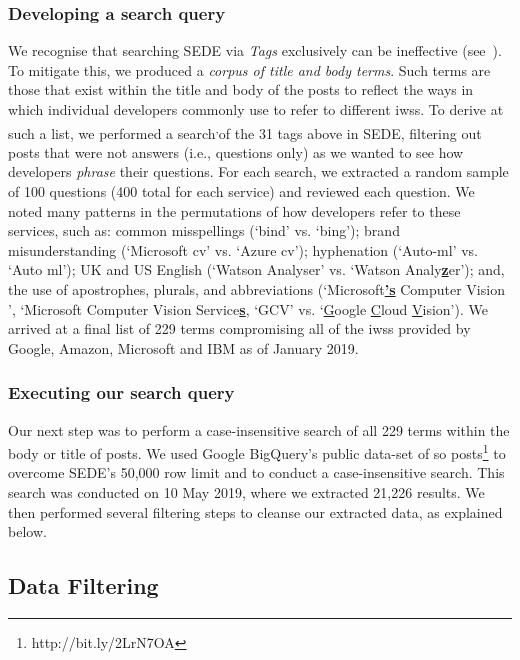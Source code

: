 \subsubsection{Developing a search query}
We recognise that searching SEDE via \textit{Tags} exclusively can be ineffective (see~\citep{Tahir:2018ks,Barua:2012gz}). To mitigate this, we produced a \textit{corpus of title and body terms}. Such terms are those that exist within the title and body of the posts to reflect the ways in which individual developers commonly use to refer to different \glspl{iws}. To derive at such a list, we performed a search\footnotemark[\footnotesearchdate{}]\textsuperscript{,}\footnotemark[\footnotereproducability{}] of the 31 tags above in SEDE, filtering out posts that were not answers (i.e., questions only) as we wanted to see how developers \textit{phrase} their questions. For each search, we extracted a random sample of 100 questions (400 total for each service) and reviewed each question. We noted many patterns in the permutations of how developers refer to these services, such as: common misspellings (`bind' vs. `bing'); brand misunderstanding (`Microsoft \gls{cv}' vs. `Azure \gls{cv}'); hyphenation (`Auto-\gls{ml}' vs. `Auto \gls{ml}'); UK and US English (`Watson Analyser' vs. `Watson Analy\uline{\textbf{z}}er'); and, the use of apostrophes, plurals, and abbreviations (`Microsoft\uline{\textbf{'s}} Computer Vision ', `Microsoft Computer Vision Service\uline{\textbf{s}}, `GCV' vs. `\uline{G}oogle \uline{C}loud \uline{V}ision'). We arrived at a final list of 229 terms compromising all of the \glspl{iws} provided by Google, Amazon, Microsoft and IBM as of January 2019\footnotemark[3].

\subsubsection{Executing our search query}

Our next step was to perform a case-insensitive search of all 229 terms within the body or title of posts. We used Google BigQuery's public data-set of \gls{so} posts\footnote{http://bit.ly/2LrN7OA} to overcome SEDE's 50,000 row limit and to conduct a case-insensitive search. This search was conducted on 10 May 2019, where we extracted 21,226 results. We then performed several filtering steps to cleanse our extracted data, as explained below.

\subsection{Data Filtering}
\label{icse2020:ssec:method:filtering}


